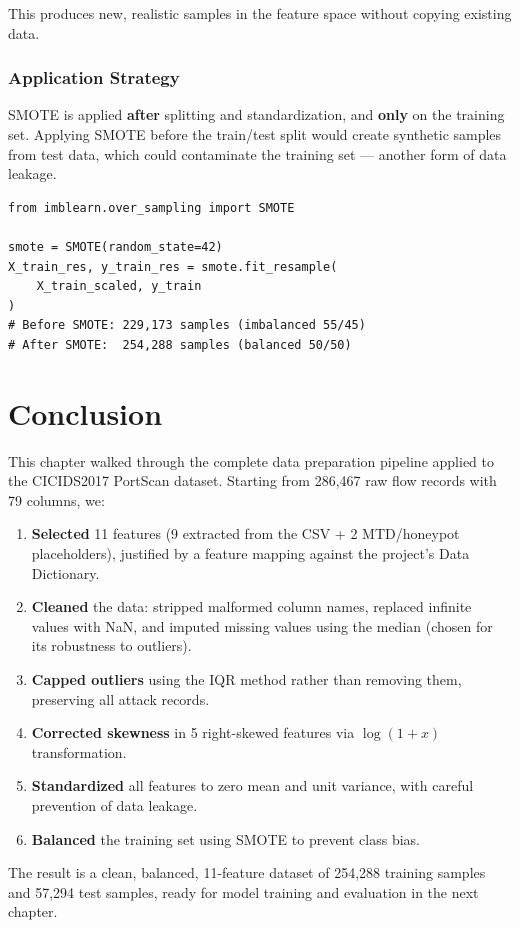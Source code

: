 This produces new, realistic samples in the feature space without copying existing data.

\subsubsection{Application Strategy}

SMOTE is applied \textbf{after} splitting and standardization, and \textbf{only} on the training set. Applying SMOTE before the train/test split would create synthetic samples from test data, which could contaminate the training set — another form of data leakage.

\begin{lstlisting}[caption={Applying SMOTE to the training set only}]
from imblearn.over_sampling import SMOTE

smote = SMOTE(random_state=42)
X_train_res, y_train_res = smote.fit_resample(
    X_train_scaled, y_train
)
# Before SMOTE: 229,173 samples (imbalanced 55/45)
# After SMOTE:  254,288 samples (balanced 50/50)
\end{lstlisting}

\section{Conclusion}

This chapter walked through the complete data preparation pipeline applied to the CICIDS2017 PortScan dataset. Starting from 286,467 raw flow records with 79 columns, we:

\begin{enumerate}
    \item \textbf{Selected} 11 features (9 extracted from the CSV + 2 MTD/honeypot placeholders), justified by a feature mapping against the project's Data Dictionary.
    \item \textbf{Cleaned} the data: stripped malformed column names, replaced infinite values with NaN, and imputed missing values using the median (chosen for its robustness to outliers).
    \item \textbf{Capped outliers} using the IQR method rather than removing them, preserving all attack records.
    \item \textbf{Corrected skewness} in 5 right-skewed features via $\log(1+x)$ transformation.
    \item \textbf{Standardized} all features to zero mean and unit variance, with careful prevention of data leakage.
    \item \textbf{Balanced} the training set using SMOTE to prevent class bias.
\end{enumerate}

The result is a clean, balanced, 11-feature dataset of 254,288 training samples and 57,294 test samples, ready for model training and evaluation in the next chapter.
